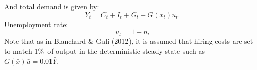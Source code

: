\documentclass[a4paper,12pt]{article}%
\begin{document}
And total demand is given by:%
\begin{equation}
Y_{t}=C_{t}+I_{t}+G_{t}+G\left(  x_{t}\right)  u_{t}.
\end{equation}
Unemployment rate:%
\begin{equation}
u_{t}=1-n_{t}%
\end{equation}
Note that as in Blanchard \& Gali (2012), it is assumed that hiring costs are
set to match 1\%\ of output in the deterministic steady state such as
$G\left(  \bar{x}\right)  \bar{u}=0.01\bar{Y}.$%

\footnotesize

%
\normalsize
\end{document}
